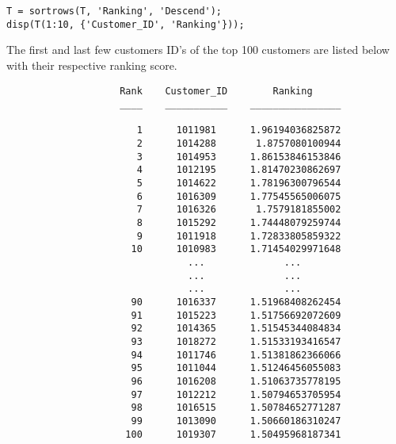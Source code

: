 \begin{lstlisting}
T = sortrows(T, 'Ranking', 'Descend');
disp(T(1:10, {'Customer_ID', 'Ranking'}));
\end{lstlisting}

\noindent
The first and last few customers ID's of the top 100 customers are listed below with their respective ranking score.

\begin{lstlisting}
                    Rank    Customer_ID        Ranking                                    
                    ____    ___________    ________________                               

                       1      1011981      1.96194036825872                               
                       2      1014288       1.8757080100944                               
                       3      1014953      1.86153846153846                               
                       4      1012195      1.81470230862697                               
                       5      1014622      1.78196300796544                               
                       6      1016309      1.77545565006075                               
                       7      1016326       1.7579181855002                               
                       8      1015292      1.74448079259744                               
                       9      1011918      1.72833805859322                               
                      10      1010983      1.71454029971648                               
                                ...              ...                                      
                                ...              ...                                      
                                ...              ...                                      
                      90      1016337      1.51968408262454                               
                      91      1015223      1.51756692072609                               
                      92      1014365      1.51545344084834                               
                      93      1018272      1.51533193416547                               
                      94      1011746      1.51381862366066                               
                      95      1011044      1.51246456055083                               
                      96      1016208      1.51063735778195                               
                      97      1012212      1.50794653705954                               
                      98      1016515      1.50784652771287                               
                      99      1013090      1.50660186310247                               
                     100      1019307      1.50495968187341                               
\end{lstlisting}
